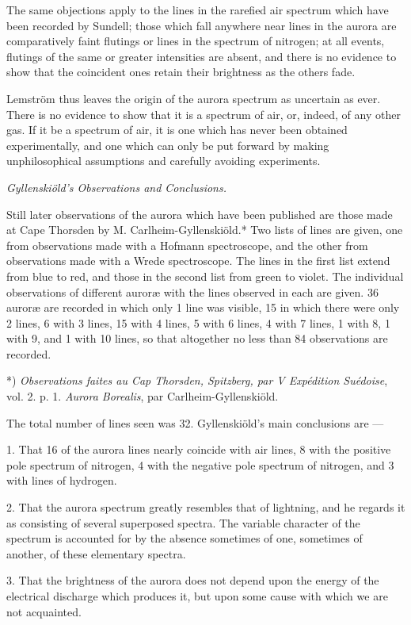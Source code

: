 \documentclass[a4paper, 12pt, oneside, polutonikogreek, english]{article}
\begin{document}
The same objections apply to the lines in the rarefied air spectrum which have been recorded by Sundell; those which fall anywhere near lines in the aurora are comparatively faint flutings or lines in the spectrum of nitrogen; at all events, flutings of the same or greater intensities are absent, and there is no evidence to show that the coincident ones retain their brightness as the others fade.

Lemström thus leaves the origin of the aurora spectrum as uncertain as ever. There is no evidence to show that it is a spectrum of air, or, indeed, of any other gas. If it be a spectrum of air, it is one which has never been obtained experimentally, and one which can only be put forward by making unphilosophical assumptions and carefully avoiding experiments.

\emph{Gyllenskiöld's Observations and Conclusions.}

Still later observations of the aurora which have been published are those made at Cape Thorsden by M. Carlheim-Gyllenskiöld.* Two lists of lines are given, one from observations made with a Hofmann spectroscope, and the other from observations made with a Wrede spectroscope. The lines in the first list extend from blue to red, and those in the second list from green to violet. The individual observations of different auroræ with the lines observed in each are given. 36 auroræ are recorded in which only 1 line was visible, 15 in which there were only 2 lines, 6 with 3 lines, 15 with 4 lines, 5 with 6 lines, 4 with 7 lines, 1 with 8, 1 with 9, and 1 with 10 lines, so that altogether no less than 84 observations are recorded.

*) \emph{Observations faites au Cap Thorsden, Spitzberg, par V Expédition Suédoise}, vol. 2. p. 1. \emph{Aurora Borealis}, par Carlheim-Gyllenskiöld.

The total number of lines seen was 32. Gyllenskiöld's main conclusions are ---

1. That 16 of the aurora lines nearly coincide with air lines, 8 with the positive pole spectrum of nitrogen, 4 with the negative pole spectrum of nitrogen, and 3 with lines of hydrogen.

2. That the aurora spectrum greatly resembles that of lightning, and he regards it as consisting of several superposed spectra. The variable character of the spectrum is accounted for by the absence sometimes of one, sometimes of another, of these elementary spectra.

3. That the brightness of the aurora does not depend upon the energy of the electrical discharge which produces it, but upon some cause with which we are not acquainted.
\end{document}
